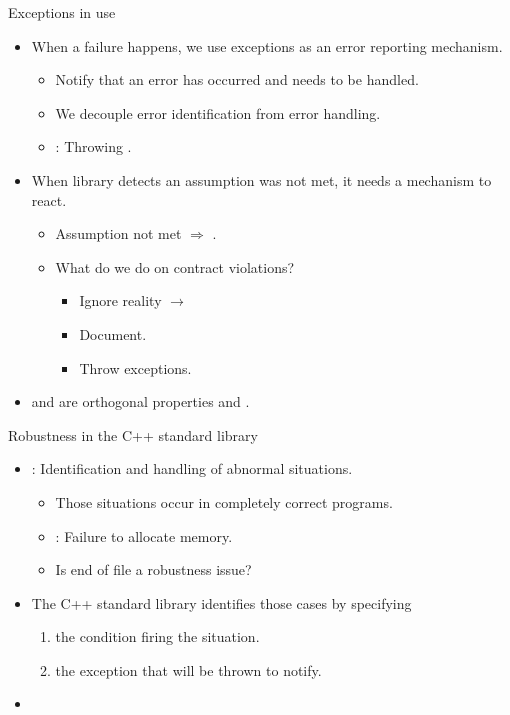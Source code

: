 \begin{frame}[t]{Exceptions in use}
\begin{itemize}
  \item When a failure happens, we use exceptions as an error reporting
mechanism.
    \begin{itemize}
      \item Notify that an error has occurred and needs to be handled.
      \item We decouple error identification from error handling.
      \item {}: Throwing .
    \end{itemize}
  \vfill\pause
  \item When library detects an assumption was not met, it needs a mechanism to
react.
    \begin{itemize}
      \item Assumption not met $\Rightarrow$ .
      \item What do we do on contract violations?
        \begin{itemize}
          \item Ignore reality $\rightarrow$ 
          \item Document.
          \item Throw exceptions.
        \end{itemize}
    \end{itemize}
  \vfill\pause
  \item {} and  are orthogonal
properties and .
\end{itemize}
\end{frame}

\begin{frame}[t]{Robustness in the C++ standard library}
\begin{itemize}
  \item {}: Identification and handling of abnormal
situations.
    \begin{itemize}
      \item Those situations occur in completely correct programs.
      \item {}: Failure to allocate memory.
      \item Is end of file a robustness issue?
    \end{itemize}

  \vfill\pause
  \item The C++ standard library identifies those cases by specifying
    \begin{enumerate}[i]
      \item the condition firing the situation.
      \item the exception that will be thrown to notify.
    \end{enumerate}
  \vfill\pause
  \item {}
\end{itemize}
\end{frame}


